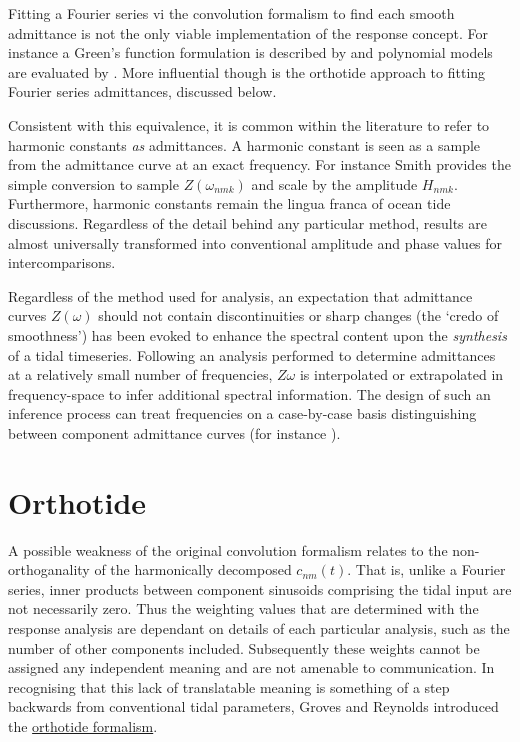 Fitting a Fourier series vi the convolution formalism to find each smooth admittance is not the only viable implementation of the response concept.  For instance a Green's function formulation is described by \citet{Webb:1974ke} and polynomial models are evaluated by \citet{Desai:1995je}. More influential though is the orthotide approach to fitting Fourier series admittances, discussed below.


Consistent with this equivalence, it is common within the literature to refer to harmonic constants \emph{as} admittances.   A harmonic constant is seen as a sample from the admittance curve at an exact frequency. For instance Smith\cite{Smith:1997ut} provides the simple conversion to sample $Z(\omega_{nmk})$ and scale by the \ATGP{} amplitude $H_{nmk}$.
Furthermore, harmonic constants remain the lingua franca of ocean tide discussions. Regardless of the detail behind any particular method, results are almost universally transformed into conventional amplitude and phase values for intercomparisons.


Regardless of the method used for analysis, an expectation that admittance curves $Z(\omega)$ should not contain discontinuities or sharp changes (the `credo of smoothness') has been evoked to enhance the spectral content upon the \emph{synthesis} of a tidal timeseries.  Following an analysis performed to determine admittances at a relatively small number of frequencies, $Z{\omega}$ is interpolated or extrapolated in frequency-space to infer additional spectral information.   The design of such an inference process can treat frequencies on a case-by-case basis distinguishing between component admittance curves (for instance \citep[pp 268]{Fu:2001ub}).

\section{Orthotide}%
A possible weakness of the original convolution formalism relates to the non-orthoganality of the harmonically decomposed $c_{nm}(t)$.  That is, unlike a Fourier series, inner products between component sinusoids comprising the tidal input are not necessarily zero.   Thus the weighting values that are determined with the response analysis are dependant on details of each particular analysis, such as the number of other components included.  Subsequently these weights cannot be assigned any independent meaning and are not amenable to communication.  
In recognising that this lack of translatable meaning is something of a step backwards from conventional tidal parameters, Groves and Reynolds \citep {Groves:1975ky} introduced the \underline{orthotide formalism}.


